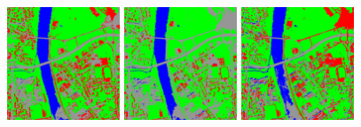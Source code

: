\begin{figure}[!h]
  \center
  \includegraphics[width=0.3\textwidth]{../Art/MonteverdiImages/classification_chain_fancyclassif_CMR_input.png}
  \includegraphics[width=0.3\textwidth]{../Art/MonteverdiImages/classification_chain_fancyclassif_CMR_input_2.png}
  \includegraphics[width=0.3\textwidth]{../Art/MonteverdiImages/classification_chain_fancyclassif_CMR_input_3.png}
  \label{fig:ClassificationMapFusionApplication}
\end{figure}


